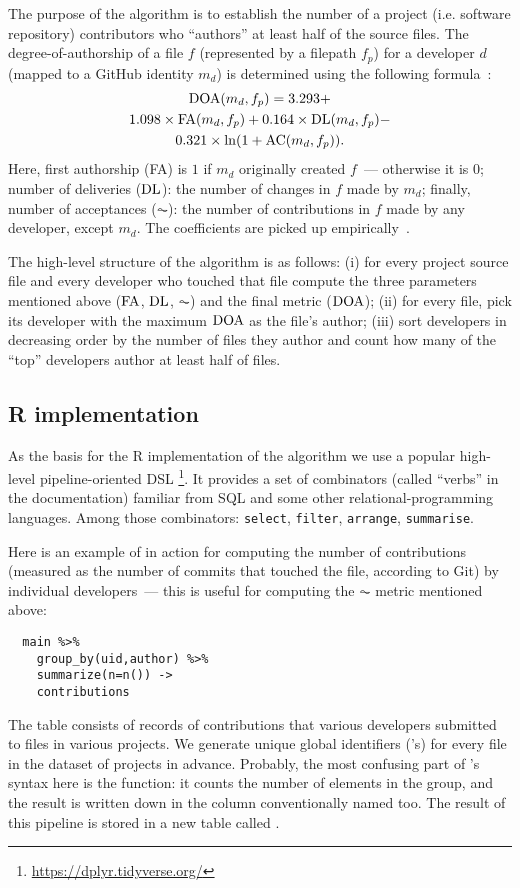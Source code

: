 The purpose of the algorithm is to establish the number of a project
(i.e. software repository) contributors who ``authors'' at least half of
the source files. The degree-of-authorship of a file $f$ (represented
by a filepath $f_p$)
for a developer $d$ (mapped to a GitHub identity $m_d$)
is determined using the following formula~\cite{tf}:
\begin{multline}
\operatorname{DOA}(m_d, f_p) =
  3.293 + \\
  1.098\times \operatorname{FA}(m_d, f_p) +
  0.164\times \operatorname{DL}(m_d, f_p) - \\
  0.321\times \ln(1 + \operatorname{AC}(m_d, f_p)).
\end{multline}
Here, first authorship (FA) is $1$ if $m_d$ originally created $f$~---
otherwise it is $0$; number of deliveries ($\operatorname{DL}$): the number of changes in $f$
made by $m_d$; finally, number of acceptances ($\AC$): the number of
contributions in $f$ made by any developer, except $m_d$. The coefficients
are picked up empirically~\cite{doa}.

The high-level structure of the algorithm is as follows: (i) for every project
source file and every developer who touched that file compute the three
parameters mentioned above ($\operatorname{FA}$, $\operatorname{DL}$, $\AC$) and the final metric ($\operatorname{DOA}$);
(ii) for every file, pick its developer with the maximum $\operatorname{DOA}$ as the file's
author; (iii) sort developers in decreasing order by the number of files
they author and count how many of the ``top'' developers author at least
half of files.

\subsection{R implementation}

As the basis for the R implementation of the algorithm we use a popular high-level
pipeline-oriented DSL \dplyr\footnote{%
\url{https://dplyr.tidyverse.org/}%
}. It provides a set of combinators (called ``verbs'' in the documentation)
familiar from SQL and some other relational-programming languages. Among those
combinators:
\texttt{select},
\texttt{filter},
\texttt{arrange},
\texttt{summarise}.

Here is an example of \dplyr in action for computing the number of contributions
(measured as the number of commits that touched the file, according to Git) by individual
developers~--- this is useful for computing the $\AC$ metric mentioned above:
\begin{verbatim}
  main %>%
    group_by(uid,author) %>%
    summarize(n=n()) ->
    contributions
\end{verbatim}
The  table consists of records of contributions that various developers
submitted to files in various projects.
We generate unique global identifiers ('s) for every file in the
dataset of projects in advance. Probably, the most confusing part of \dplyr's
syntax here is the  function: it counts the number of elements in the
group, and the result is written down in the column conventionally named 
too. The result of this pipeline is stored in a new table called .


